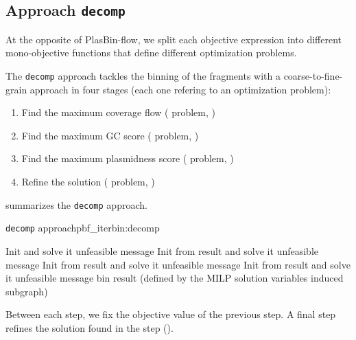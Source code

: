 \subsection{Approach \texttt{decomp}}\label{sec:pbf_iterbin:decomp}

\begin{newfeatbox}
  At the opposite of PlasBin-flow, we split each objective expression into different mono-objective functions that define different optimization problems.
\end{newfeatbox}
The \texttt{decomp} approach tackles the binning of the fragments with a coarse-to-fine-grain approach in four stages (each one refering to an optimization problem):

\begin{enumerate}[label=\roman*.]
  \item Find the maximum coverage flow (\MCF{} problem, )
  \item Find the maximum GC score (\MGC{} problem, )
  \item Find the maximum plasmidness score (\MPS{} problem, )
  \item Refine the solution (\MRCF{} problem, )
\end{enumerate}

 summarizes the \texttt{decomp} approach.

\begin{tcbalgo}{\texttt{decomp} approach}{pbf_iterbin:decomp}
  \begin{algorithmic}[1]
    \State{} Init \MCF{} and solve it
    \State{} \Return{}unfeasible message
    \EndIf{}
    \State{} Init \MGC{} from \MCF{} result and solve it
    \State{} \Return{}unfeasible message
    \EndIf{}
    \State{} Init \MPS{} from \MGC{} result and solve it
    \State{} \Return{}unfeasible message
    \EndIf{}
    \State{} Init \MRCF{} from \MPS{} result and solve it
    \State{} \Return{}unfeasible message
    \EndIf{}
    \State{} \Return{}\MRCF{} bin result (defined by the MILP solution variables induced subgraph)
    \EndFunction{}
  \end{algorithmic}
\end{tcbalgo}

Between each step, we fix the objective value of the previous step.
A final step refines the solution found in the \MPS{} step ().




